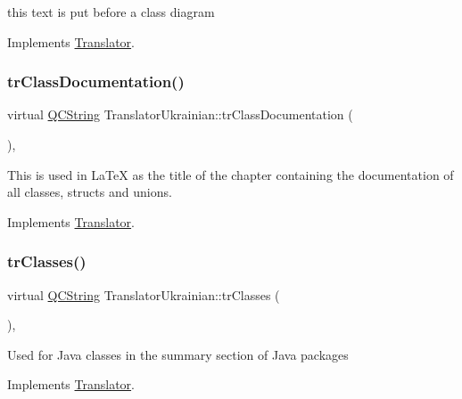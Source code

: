this text is put before a class diagram 

Implements \mbox{\hyperlink{class_translator}{Translator}}.

\mbox{\label{class_translator_ukrainian_a3d8242db72ce4626180b483957be0510}} 
\subsubsection{\texorpdfstring{trClassDocumentation()}{trClassDocumentation()}}
{\footnotesize\ttfamily virtual \mbox{\hyperlink{class_q_c_string}{Q\+C\+String}} Translator\+Ukrainian\+::tr\+Class\+Documentation (\begin{DoxyParamCaption}{ }\end{DoxyParamCaption})\hspace{0.3cm}{\ttfamily [inline]}, {\ttfamily [virtual]}}

This is used in La\+TeX as the title of the chapter containing the documentation of all classes, structs and unions. 

Implements \mbox{\hyperlink{class_translator}{Translator}}.

\mbox{\label{class_translator_ukrainian_a092735efe7287688c9d031c88a8c2f0c}} 
\subsubsection{\texorpdfstring{trClasses()}{trClasses()}}
{\footnotesize\ttfamily virtual \mbox{\hyperlink{class_q_c_string}{Q\+C\+String}} Translator\+Ukrainian\+::tr\+Classes (\begin{DoxyParamCaption}{ }\end{DoxyParamCaption})\hspace{0.3cm}{\ttfamily [inline]}, {\ttfamily [virtual]}}

Used for Java classes in the summary section of Java packages 

Implements \mbox{\hyperlink{class_translator}{Translator}}.

\mbox{\label{class_translator_ukrainian_a5a6952a6788a764d20c8cc69fa573487}} 
